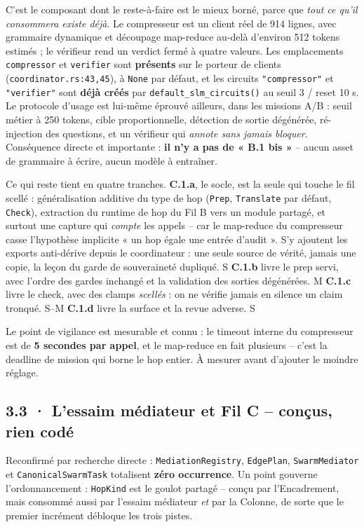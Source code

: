 \documentclass[10pt]{article}
\newcommand{\sz}[1]{{\small\color{grey}\textsf{#1}}}
\newcommand{\code}[1]{\texttt{\small #1}}
\begin{document}
C'est le composant dont le reste-à-faire est le mieux borné, parce que \emph{tout ce qu'il consommera
existe déjà}. Le compresseur est un client réel de 914 lignes, avec grammaire dynamique et découpage
map-reduce au-delà d'environ 512 tokens estimés ; le vérifieur rend un verdict fermé à quatre valeurs.
Les emplacements \code{compressor} et \code{verifier} sont \textbf{présents} sur le porteur de clients
(\code{coordinator.rs:43,45}), à \code{None} par défaut, et les circuits \code{"compressor"} et
\code{"verifier"} sont \textbf{déjà créés} par \code{default\_slm\_circuits()} au seuil 3 / reset 10 s.
Le protocole d'usage est lui-même éprouvé ailleurs, dans les missions A/B : seuil métier à 250 tokens,
cible proportionnelle, détection de sortie dégénérée, ré-injection des questions, et un vérifieur qui
\emph{annote sans jamais bloquer}. Conséquence directe et importante : \textbf{il n'y a pas de « B.1
bis »} -- aucun asset de grammaire à écrire, aucun modèle à entraîner.

Ce qui reste tient en quatre tranches. \textbf{C.1.a}, le socle, est la seule qui touche le fil scellé :
généralisation additive du type de hop (\code{Prep}, \code{Translate} par défaut, \code{Check}),
extraction du runtime de hop du Fil B vers un module partagé, et surtout une capture qui \emph{compte}
les appels -- car le map-reduce du compresseur casse l'hypothèse implicite « un hop égale une entrée
d'audit ». S'y ajoutent les exports anti-dérive depuis le coordinateur : une seule source de vérité,
jamais une copie, la leçon du garde de souveraineté dupliqué. \sz{S} \textbf{C.1.b} livre le prep servi,
avec l'ordre des gardes inchangé et la validation des sorties dégénérées. \sz{M} \textbf{C.1.c} livre le
check, avec des clamps \emph{scellés} : on ne vérifie jamais en silence un claim tronqué. \sz{S--M}
\textbf{C.1.d} livre la surface et la revue adverse. \sz{S}

Le point de vigilance est mesurable et connu : le timeout interne du compresseur est de \textbf{5
secondes par appel}, et le map-reduce en fait plusieurs -- c'est la deadline de mission qui borne le hop
entier. À mesurer avant d'ajouter le moindre réglage.

\subsection{3.3 · L'essaim médiateur et Fil C -- conçus, rien codé}

Reconfirmé par recherche directe : \code{MediationRegistry}, \code{EdgePlan}, \code{SwarmMediator} et
\code{CanonicalSwarmTask} totalisent \textbf{zéro occurrence}. Un point gouverne l'ordonnancement :
\code{HopKind} est le goulot partagé -- conçu par l'Encadrement, mais consommé aussi par l'essaim
médiateur \emph{et} par la Colonne, de sorte que le premier incrément débloque les trois pistes.
\end{document}

